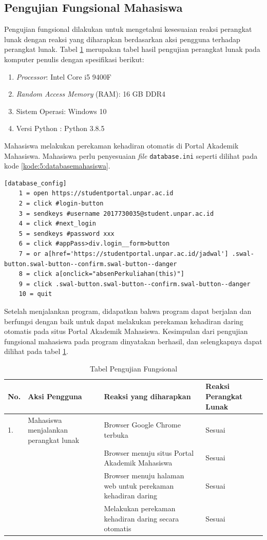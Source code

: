 \subsection{Pengujian Fungsional Mahasiswa}
Pengujian fungsional dilakukan untuk mengetahui kesesuaian reaksi perangkat lunak dengan reaksi yang diharapkan berdasarkan aksi pengguna terhadap perangkat lunak. Tabel \ref{tab:fungsiMahasiswa} merupakan tabel hasil pengujian perangkat lunak pada komputer penulis dengan spesifikasi berikut:
\begin{enumerate}
	\item \textit{Processor}: Intel Core i5 9400F
	\item \textit{Random Access Memory} (RAM): 16 GB DDR4
	\item Sistem Operasi: Windows 10
	\item Versi Python : Python 3.8.5
\end{enumerate}
Mahasiswa melakukan perekaman kehadiran otomatis di Portal Akademik Mahasiswa. Mahasiswa perlu penyesuaian \textit{file} \texttt{database.ini} seperti dilihat pada kode \ref{kode:5:databasemahasiswa}.
\begin{lstlisting}[caption=\textit{File} \texttt{database.ini} Portal Akademik Mahasiswa (\textit{password} disembunyikan), label=kode:5:databasemahasiswa]
	[database_config]
	1 = open https://studentportal.unpar.ac.id
	2 = click #login-button
	3 = sendkeys #username 2017730035@student.unpar.ac.id 
	4 = click #next_login
	5 = sendkeys #password xxx
	6 = click #appPass>div.login__form>button
	7 = or a[href='https://studentportal.unpar.ac.id/jadwal'] .swal-button.swal-button--confirm.swal-button--danger
	8 = click a[onclick="absenPerkuliahan(this)"]
	9 = click .swal-button.swal-button--confirm.swal-button--danger
	10 = quit
\end{lstlisting}


Setelah menjalankan program, didapatkan bahwa program dapat berjalan dan berfungsi dengan baik untuk dapat melakukan perekaman kehadiran daring otomatis pada situs Portal Akademik Mahasiswa. Kesimpulan dari pengujian fungsional mahasiswa pada program dinyatakan berhasil, dan selengkapnya dapat dilihat pada tabel \ref{tab:fungsiMahasiswa}.

\begin{table}[H]			
	\caption{Tabel Pengujian Fungsional}
	\centering
	\begin{tabular}{|p{0.5cm} |p{4cm} |p{5.5cm}| p{3cm}|} \hline
		No. & Aksi Pengguna & Reaksi yang diharapkan & Reaksi Perangkat Lunak\\ \hline     
		1. 	& Mahasiswa menjalankan perangkat lunak & Browser Google Chrome terbuka & Sesuai\\ \hline 
	 		& &  Browser menuju situs Portal Akademik Mahasiswa & Sesuai\\ \hline 
			& &  Browser menuju halaman web untuk perekaman kehadiran daring & Sesuai\\ \hline 
			& &  Melakukan perekaman kehadiran daring secara otomatis & Sesuai\\ \hline
	\end{tabular}
	\label{tab:fungsiMahasiswa}
\end{table}

